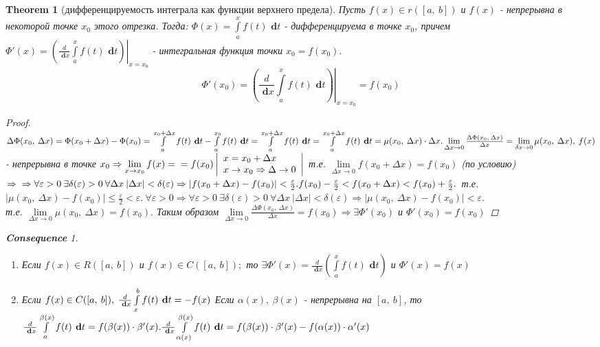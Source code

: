 \documentclass[a4paper,12pt, centered]{bookest}
\newtheorem{theorem}{Theorem}[section]
\theoremstyle{remark}
\newtheorem*{cons*}{\textbf{Consequence}}
\newcommand\dx{\textbf{ d}x}
\newcommand\dy{\textbf{ d}}
\begin{document}
\begin{theorem}[дифференцируемость интеграла как функции верхнего предела]
	Пусть $f(x)\in r([a,\>b])$ и $f(x)$ - непрерывна в некоторой точке $x_0$ этого отрезка. Тогда: $\Phi(x)=\int\limits_{a}^{x}f(t)\dy t$ - дифференцируема в точке $x_0$, причем $\Phi'(x)=\left.\left(\frac d{\dx}\int\limits_{a}^{x}f(t)\dy t\right)\right|_{x=x_0}$ - интегральная функция точки $x_0=f(x_0).$ $$\Phi'(x_0)=\left.\left(\frac d{\dx}\int\limits_{a}^{x}f(t)\dy t\right)\right|_{x=x_0}=f(x_0)$$
	\begin{proof}
		$\Delta\Phi (x_0,\>\Delta x)=\Phi(x_0+\Delta x)-\Phi(x_0)=\int\limits_{a}^{x_0+\Delta x}f(t)\dy t-\int\limits_{a}^{x_0}f(t)\dy t=\int\limits_{a}^{x_0+\Delta x}f(t)\dy t=\int\limits_{a}^{x_0+\Delta x}f(t)\dy t=\mu(x_0,\>\Delta x)\cdot\Delta x.\\\lim\limits_{\Delta x\to0}\frac{\Delta\Phi(x_0,\>\Delta x)}{\Delta x}=\lim\limits_{\delta x\to0}\mu(x_0,\>\Delta x),\>f(x)$ - непрерывна в точке $x_0\Rightarrow\lim\limits_{x\to x_0}f(x)=\\=f(x_0)\left| \begin{array}{l}
			x=x_0+\Delta x\\x\to x_0\Rightarrow\Delta\to0
		\end{array}\right|$ т.е. $\lim\limits_{\Delta x\to0}f(x_0+\Delta x)=f(x_0)$ (по условию) $\Rightarrow\\\Rightarrow\forall\varepsilon>0\>\exists\delta(\varepsilon)>0\>\forall\Delta x\>|\Delta x|<\delta(\varepsilon)\Rightarrow|f(x_0+\Delta x)-f(x_0)|<\frac\varepsilon2.\\f(x_0)-\frac{\varepsilon}{2}<f(x_0+\Delta x)<f(x_0)+\frac\varepsilon2.$ т.е. $|\mu(x_0,\>\Delta x)-f(x_0)|\leq \frac{\varepsilon}{2}<\varepsilon.\>\forall\varepsilon>0\Rightarrow\forall\varepsilon>0\>\exists\delta(\varepsilon)>0\>\forall\Delta x\>|\Delta x|<\delta(\varepsilon)\Rightarrow|\mu(x_0,\>\Delta x)-f(x_0)|<\varepsilon.$\\ т.е. $\lim\limits_{\Delta x\to0}\mu(x_0,\>\Delta x)=f(x_0).$ Таким образом $\lim\limits_{\Delta x\to0}\frac{\Delta\Phi(x_0,\>\Delta x)}{\Delta x}=f(x_0)\Rightarrow\exists\Phi'(x_0)$ и $\Phi'(x_0)=f(x_0)$ 
 	\end{proof}
 	\begin{cons*}$ $
 		\begin{enumerate}
 			\item Если $f(x)\in R([a,\>b])$ и $f(x)\in C([a,\>b]);$ то $\exists\Phi'(x)=\frac{d}{\dx}\left(\int\limits_{a}^{x}f(t)\dy t\right)$ и $\Phi'(x)=f(x)$
 			\item Если $f(x)\in C([a,\>b]),\>\frac{d}{\dx}\int\limits_{x}^{b}f(t)\dy t=-f(x)\\$ Если $\alpha(x),\>\beta(x)$ - непрерывна на $[a,\>b]$, то $\frac{d}{\dx}\int\limits_{a}^{\beta(x)}f(t)\dy t=f(\beta(x))\cdot\beta'(x).\\\frac{d}{\dx}\int\limits_{\alpha(x)}^{\beta(x)}f(t)\dy t=f(\beta(x))\cdot\beta'(x)-f(\alpha(x))\cdot\alpha'(x)$ 
 		\end{enumerate}
 	\end{cons*}
\end{theorem}
\end{document}
